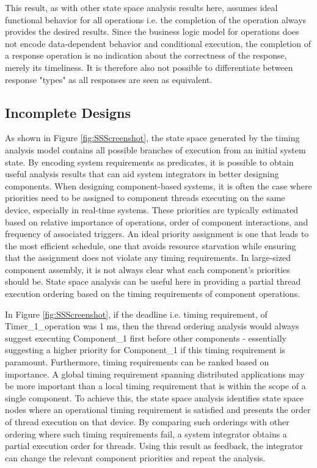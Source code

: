 This result, as with other state space analysis results here, assumes ideal functional behavior for all operations i.e. the completion of the operation always provides the desired results. Since the business logic model for operations does not encode data-dependent behavior and conditional execution, the completion of a response operation is no indication about the correctness of the response, merely its timeliness. It is therefore also not possible to differentiate between response "types" as all responses are seen as equivalent. 

\subsection{Incomplete Designs}

As shown in Figure \ref{fig:SSScreenshot}, the state space generated by the timing analysis model contains all possible branches of execution from an initial system state. By encoding system requirements as predicates, it is possible to obtain useful analysis results that can aid system integrators in better designing components. When designing component-based systems, it is often the case where priorities need to be assigned to component threads executing on the same device, especially in real-time systems. These priorities are typically estimated based on relative importance of operations, order of component interactions, and frequency of associated triggers. An ideal priority assignment is one that leads to the most efficient schedule, one that avoids resource starvation while ensuring that the assignment does not violate any timing requirements. In large-sized component assembly, it is not always clear what each component's priorities should be. State space analysis can be useful here in providing a partial thread execution ordering based on the timing requirements of component operations. 

In Figure \ref{fig:SSScreenshot}, if the deadline i.e. timing requirement, of Timer\_1\_operation was 1 ms, then the thread ordering analysis would always suggest executing Component\_1 first before other components - essentially suggesting a higher priority for Component\_1 if this timing requirement is paramount. Furthermore, timing requirements can be ranked based on importance. A global timing requirement spanning distributed applications may be more important than a local timing requirement that is within the scope of a single component. To achieve this, the state space analysis identifies state space nodes where an operational timing requirement is satisfied and presents the order of thread execution on that device. By comparing such orderings with other ordering where such timing requirements fail, a system integrator obtains a partial execution order for threads. Using this result as feedback, the integrator can change the relevant component priorities and repeat the analysis. 


